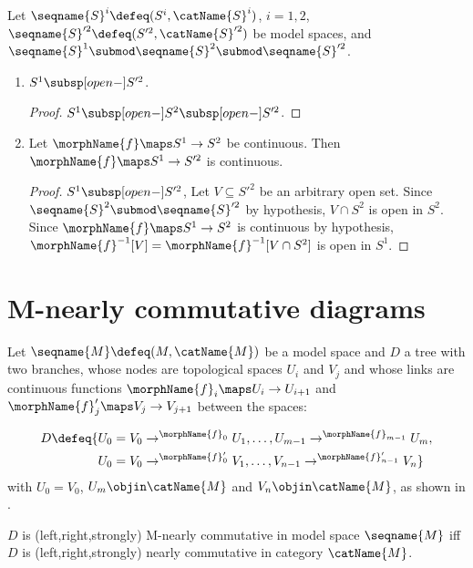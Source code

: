 \documentclass{article}
\begin{document}
\begin{corollary}
\label{cor:modsub}
Let $\seqname{S}^i \defeq (S^i,\catName{S}^i)$, $i=1,2$,
$\seqname{S}'^2 \defeq (S'^2,\catName{S}'^2)$ be model spaces, and
$\seqname{S}^1 \submod \seqname{S}^2 \submod \seqname{S}'^2$.
\begin{enumerate}

\item
$S^1 \subsp[open-] S'^2$.

\begin{proof}
$S^1 \subsp[open-] S^2 \subsp[open-] S'^2$.
\end{proof}

\item
Let $\morphName{f} \maps S^1 \to S^2$ be continuous. Then
$\morphName{f} \maps S^1 \to S'^2$ is continuous.
\begin{proof}
$S^1 \subsp[open-] S'^2$, Let $V \subseteq S'^2$ be an arbitrary open
set.  Since $\seqname{S}^2 \submod \seqname{S}'^2$ by hypothesis,
$V \cap S^2$ is open in $S^2$.  Since $\morphName{f} \maps S^1 \to S^2$
is continuous by hypothesis,
$\morphName{f}^{-1}[V] = \morphName{f}^{-1}[V \cap S^2]$
is open in $S^1$.
\end{proof}
\end{enumerate}
\end{corollary}

\section{M-nearly commutative diagrams}
\label{sec:M-NCD}
Let $\seqname{M} \defeq (M,\catName{M})$ be a model space and $D$ a tree
with two branches, whose nodes are topological spaces $U_i$ and $V_j$
and whose links are continuous functions
$\morphName{f}_i \maps U_i \to U_{i+1}$ and
$\morphName{f}'_j \maps V_j \to V_{j+1}$ between the spaces:

\begin{align*}
D \defeq \{
  &
    U_0 = V_0 \to^{\morphName{f}_0} U_1,
    \dotsc,
    U_{m-1} \to^{\morphName{f}_{m-1}} U_m,
\\
  &
    U_0 = V_0 \to^{\morphName{f}'_0} V_1,
    \dotsc,
    V_{n-1} \to^{\morphName{f}'_{n-1}} V_n
\}
\end{align*}
with $U_0 = V_0$, $U_m \objin \catName{M}$ and
$V_n \objin \catName{M}$, as shown in .

\begin{definition}
\label{def:M-NCD}
$D$ is (left,right,strongly) M-nearly commutative in model space
$\seqname{M}$ iff $D$ is (left,right,strongly) nearly commutative in
category $\catName{M}$.
\end{definition}
\end{document}
